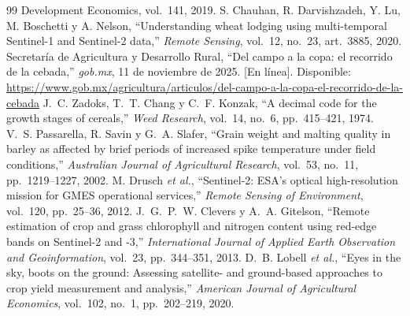 \begin{thebibliography}{99}
{  Development Economics}, vol.~141, 2019.
 S. Chauhan, R. Darvishzadeh, Y. Lu, M. Boschetti y A. Nelson, ``Understanding wheat lodging
  using multi-temporal Sentinel-1 and Sentinel-2 data,'' \emph{Remote Sensing}, vol.~12, no.~23, art.~3885, 2020.
 Secretaría de Agricultura y Desarrollo Rural, ``Del campo a la copa: el recorrido de la cebada,'' \emph{gob.mx}, 11 de noviembre de 2025. [En línea]. Disponible: \url{https://www.gob.mx/agricultura/articulos/del-campo-a-la-copa-el-recorrido-de-la-cebada}
 J.~C. Zadoks, T.~T. Chang y C.~F. Konzak, ``A decimal code for the growth stages of cereals,'' \emph{Weed Research}, vol.~14, no.~6, pp.~415--421, 1974.
 V.~S. Passarella, R. Savin y G.~A. Slafer, ``Grain weight and malting quality in barley as affected by brief periods of increased spike temperature under field conditions,'' \emph{Australian Journal of Agricultural Research}, vol.~53, no.~11, pp.~1219--1227, 2002.
 M. Drusch \emph{et al.}, ``Sentinel-2: ESA's optical high-resolution mission for GMES operational services,'' \emph{Remote Sensing of Environment}, vol.~120, pp.~25--36, 2012.
 J.~G.~P.~W. Clevers y A.~A. Gitelson, ``Remote estimation of crop and grass chlorophyll and nitrogen content using red-edge bands on Sentinel-2 and -3,'' \emph{International Journal of Applied Earth Observation and Geoinformation}, vol.~23, pp.~344--351, 2013.
 D.~B. Lobell \emph{et al.}, ``Eyes in the sky, boots on the ground: Assessing satellite- and ground-based approaches to crop yield measurement and analysis,'' \emph{American Journal of Agricultural Economics}, vol.~102, no.~1, pp.~202--219, 2020.
\end{thebibliography}
